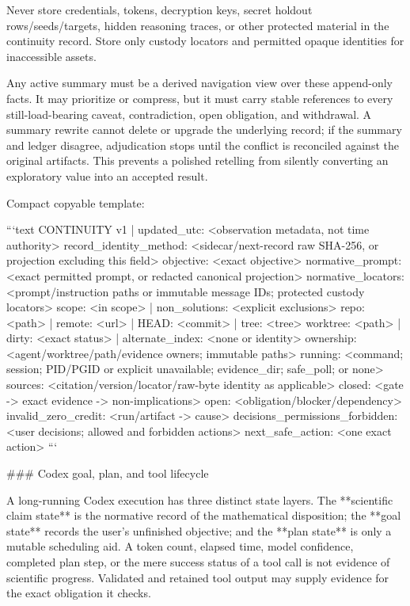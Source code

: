 \documentclass[11pt]{article}
\begin{document}
\begin{markdown}
Never store credentials, tokens, decryption keys, secret holdout rows/seeds/targets, hidden reasoning
traces, or other protected material in the continuity record. Store only custody locators and
permitted opaque identities for inaccessible assets.

Any active summary must be a derived navigation view over these append-only facts. It may prioritize
or compress, but it must carry stable references to every still-load-bearing caveat, contradiction,
open obligation, and withdrawal. A summary rewrite cannot delete or upgrade the underlying record;
if the summary and ledger disagree, adjudication stops until the conflict is reconciled against the
original artifacts. This prevents a polished retelling from silently converting an exploratory
value into an accepted result.

Compact copyable template:

```text
CONTINUITY v1 | updated_utc: <observation metadata, not time authority>
record_identity_method: <sidecar/next-record raw SHA-256, or projection excluding this field>
objective: <exact objective>
normative_prompt: <exact permitted prompt, or redacted canonical projection>
normative_locators: <prompt/instruction paths or immutable message IDs; protected custody locators>
scope: <in scope> | non_solutions: <explicit exclusions>
repo: <path> | remote: <url> | HEAD: <commit> | tree: <tree>
worktree: <path> | dirty: <exact status> | alternate_index: <none or identity>
ownership: <agent/worktree/path/evidence owners; immutable paths>
running: <command; session; PID/PGID or explicit unavailable; evidence_dir; safe_poll; or none>
sources: <citation/version/locator/raw-byte identity as applicable>
closed: <gate -> exact evidence -> non-implications>
open: <obligation/blocker/dependency>
invalid_zero_credit: <run/artifact -> cause>
decisions_permissions_forbidden: <user decisions; allowed and forbidden actions>
next_safe_action: <one exact action>
```

### Codex goal, plan, and tool lifecycle

A long-running Codex execution has three distinct state layers. The **scientific claim state** is the
normative record of the mathematical disposition; the **goal state** records the user's unfinished
objective; and the **plan state** is only a mutable scheduling aid. A token count, elapsed time, model
confidence, completed plan step, or the mere success status of a tool call is not evidence of
scientific progress. Validated and retained tool output may supply evidence for the exact obligation
it checks.


\end{markdown}
\end{document}
